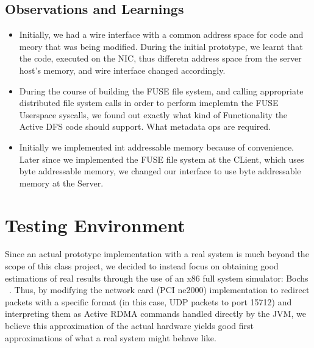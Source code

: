 \documentclass[10pt]{article}
\begin{document}
\subsection{Observations and Learnings}
\begin{itemize}
\item Initially, we had a wire interface with a common address space for code and meory that was being modified. During the initial prototype, we learnt that the code, executed on the NIC, thus 
differetn address space from the server host's memory, and wire interface changed accordingly.
\item During the course of building the FUSE file system, and calling appropriate distributed  file system calls in order to perform imeplemtn the FUSE Userspace syscalls, we found out exactly what kind of Functionality the Active DFS code should support. What metadata ops are required.
\item Initially we implemented int addressable memory because of convenience. Later since we implemented the FUSE file system at the CLient, which uses byte addressable memory, we changed our interface to use byte addressable memory at the Server.
\end{itemize}

\section{Testing Environment}

Since an actual prototype implementation with a real system is much beyond the scope of this class project, we decided to instead focus on obtaining good estimations of real results through the use of an x86 full system simulator: Bochs ~\cite{bochs}. Thus, by modifying the network card (PCI ne2000) implementation to redirect packets with a specific format (in this case, UDP packets to port 15712) and interpreting them as Active RDMA commands handled directly by the JVM, we believe this approximation of the actual hardware yields good first approximations of what a real system might behave like.

%  
  
\end{document}
